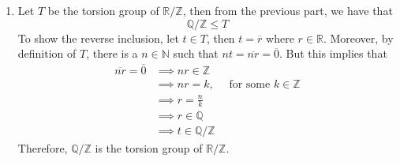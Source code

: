\begin{solution}
\begin{enumerate}[label = \textbf{(\alph*)}]
        \item Let $T$ be the torsion group of $\mathbb{R/Z}$, then from the previous part, we have that
        $$\mathbb{Q/Z} \leq T$$
        To show the reverse inclusion, let $t \in T$, then $t = \overline{r}$ where $r \in \mathbb{R}$. Moreover, by definition of $T$, there is a $n \in \mathbb{N}$ such that $nt = \overline{nr} = \overline{0}$. But this implies that 
        \begin{align*}
            \overline{nr} = \overline{0} &\implies nr \in \mathbb{Z} \\
            &\implies nr = k, \quad \text{ for some } k \in \mathbb{Z} \\
            &\implies r = \frac{n}{k} \\
            &\implies r \in \mathbb{Q} \\
            &\implies t \in \mathbb{Q/Z}
        \end{align*}
        Therefore, $\mathbb{Q/Z}$ is the torsion group of $\mathbb{R/Z}$.


\end{enumerate}
\end{solution}
